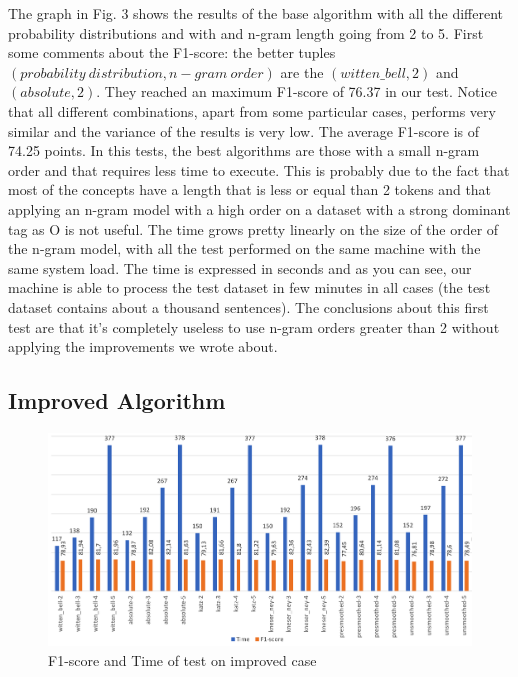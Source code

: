 \documentclass[11pt,a4paper]{article}
\begin{document}
The graph in Fig. 3 shows the results of the base algorithm with all the different probability distributions and with and n-gram length going from 2 to 5. First some comments about the F1-score: the better tuples $(probability\ distribution, n-gram\ order)$ are the $(witten\_bell,2)$ and $(absolute,2)$. They reached an maximum F1-score of 76.37 in our test. Notice that all different combinations, apart from some particular cases, performs very similar and the variance of the results is very low. The average F1-score is of 74.25 points. In this tests, the best algorithms are those with a small n-gram order and that requires less time to execute. This is probably due to the fact that most of the concepts have a length that is less or equal than 2 tokens and that applying an n-gram model with a high order on a dataset with a strong dominant tag as O is not useful.
The time grows pretty linearly on the size of the order of the n-gram model, with all the test performed on the same machine with the same system load. The time is expressed in seconds and as you can see, our machine is able to process the test dataset in few minutes in all cases (the test dataset contains about a thousand sentences). The conclusions about this first test are that it's completely useless to use n-gram orders greater than 2 without applying the improvements we wrote about.

\subsection{Improved Algorithm}

\begin{figure}
  \includegraphics[width=\textwidth]{test_impr.png}
  \caption{F1-score and Time of test on improved case}
\end{figure}
\end{document}
